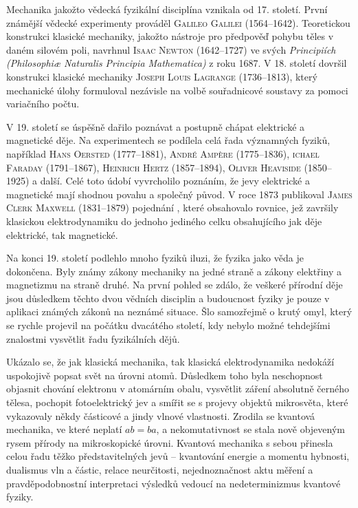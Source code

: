     
    Mechanika jakožto vědecká fyzikální disciplína vznikala od 17. století. První známější vědecké
    experimenty prováděl \textsc{Galileo Galilei} (1564–1642). Teoretickou konstrukci klasické
    mechaniky, jakožto nástroje pro předpověď pohybu těles v daném silovém poli, navrhnul
    \textsc{Isaac Newton} (1642–1727) ve svých \emph{Principiích (Philosophiæ Naturalis Principia
    Mathematica)} z roku 1687. V 18. století dovršil konstrukci klasické mechaniky \textsc{Joseph
    Louis Lagrange} (1736–1813), který mechanické úlohy formuloval nezávisle na volbě souřadnicové
    soustavy za pomoci variačního počtu.
    
    V 19. století se úspěšně dařilo poznávat a postupně chápat elektrické a magnetické děje. Na
    experimentech se podílela celá řada významných fyziků, například \textsc{Hans Oersted}
    (1777–1881), \textsc{André Ampère} (1775–1836), \textsc{ichael Faraday} (1791–1867),
    \textsc{Heinrich Hertz} (1857–1894), \textsc{Oliver Heaviside} (1850–1925) a další. Celé toto
    údobí vyvrcholilo poznáním, že jevy elektrické a magnetické mají shodnou povahu a společný
    původ. V roce 1873 publikoval \textsc{James Clerk Maxwell} (1831–1879) pojednání , které obsahovalo rovnice, jež završily klasickou elektrodynamiku
    do jednoho jediného celku obsahujícího jak děje elektrické, tak magnetické. 
    
    Na konci 19. století podlehlo mnoho fyziků iluzi, že fyzika jako věda je dokončena. Byly známy
    zákony mechaniky na jedné straně a zákony elektřiny a magnetizmu na straně druhé. Na první
    pohled se zdálo, že veškeré přírodní děje jsou důsledkem těchto dvou vědních disciplin a
    budoucnost fyziky je pouze v aplikaci známých zákonů na neznámé situace. Šlo samozřejmě o krutý
    omyl, který se rychle projevil na počátku dvacátého století, kdy nebylo možné tehdejšími
    znalostmi vysvětlit řadu fyzikálních dějů. 

    Ukázalo se, že jak klasická mechanika, tak klasická elektrodynamika nedokáží uspokojivě popsat
    svět na úrovni atomů. Důsledkem toho byla neschopnost objasnit chování elektronu v atomárním
    obalu, vysvětlit záření absolutně černého tělesa, pochopit fotoelektrický jev a smířit se s
    projevy objektů mikrosvěta, které vykazovaly někdy částicové a jindy vlnové vlastnosti. Zrodila
    se kvantová mechanika, ve které neplatí \(ab = ba\), a nekomutativnost se stala nově objeveným
    rysem přírody na mikroskopické úrovni. Kvantová mechanika s sebou přinesla celou řadu těžko
    představitelných jevů – kvantování energie a momentu hybnosti, dualismus vln a částic, relace
    neurčitosti, nejednoznačnost aktu měření a pravděpodobnostní interpretaci výsledků vedoucí na
    nedeterminizmus kvantové fyziky.

